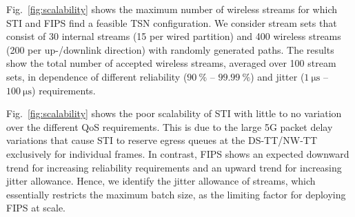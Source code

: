 Fig.~\ref{fig:scalability} shows the maximum number of wireless streams for which STI and FIPS find a feasible TSN configuration.
We consider stream sets that consist of 30 internal streams (15 per wired partition) and 400 wireless streams (200 per up-/downlink direction) with randomly generated paths.
The results show the total number of accepted wireless streams, averaged over 100 stream sets, in dependence of different reliability ($\qty{90}{\percent}$ -- $\qty{99.99}{\percent}$) and jitter ($\qty{1}{\us}$ -- $\qty{100}{\us}$) requirements.

Fig.~\ref{fig:scalability} shows the poor scalability of STI with little to no variation over the different QoS requirements.
This is due to the large 5G packet delay variations that cause STI to reserve egress queues at the DS-TT/NW-TT exclusively for individual frames.
In contrast, FIPS shows an expected downward trend for increasing reliability requirements and an upward trend for increasing jitter allowance. 
Hence, we identify the jitter allowance of streams, which essentially restricts the maximum batch size, as the limiting factor for deploying FIPS at scale.

